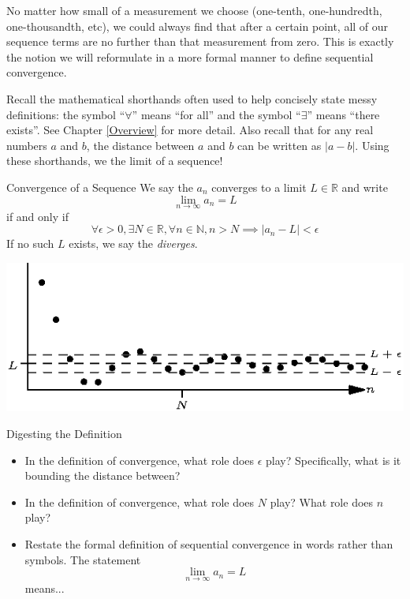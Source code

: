 No matter how small of a measurement we choose (one-tenth, one-hundredth, one-thousandth, etc), we could always find that after a certain point, all of our sequence terms are no further than that measurement from zero.  This is exactly the notion we will reformulate in a more formal manner to define sequential convergence.  

  Recall the mathematical shorthands often used to help concisely state messy definitions: the symbol ``$\forall$'' means ``for all'' and the symbol ``$\exists$'' means ``there exists''.  See Chapter \ref{Overview} for more detail.  Also recall that for any real numbers $a$ and $b$, the distance between $a$ and $b$ can be written as $\left|a-b\right|$.  Using these shorthands, we  the limit of a sequence!

\begin{definition}{Convergence of a Sequence}
We say the  $a_n$ converges to a limit $L\in \mathbb{R}$ and write
$$\lim_{n \rightarrow \infty }a_n=L $$ if and only if$$\forall\epsilon>0, \exists N \in \mathbb{R}, \forall n\in \mathbb{N}, n>N \implies \left| a_n-L\right|<\epsilon$$ If no such $L$ exists, we say the  \emph{diverges}.
\end{definition}

	\begin{center}
	\includegraphics[width=400pt]{ChapterSeqSer/Figures/convergepsilon.eps}
	\end{center}

\begin{exercise}{Digesting the Definition \Coffeecup \Coffeecup}
\begin{itemize}
\item In the definition of convergence, what role does $\epsilon$ play?   Specifically, what is it bounding the distance between?
\item In the definition of convergence, what role does $N$ play?  What role does $n$ play?
\item Restate the formal definition of sequential convergence in words rather than symbols.  The statement 
$$ \lim_{n \rightarrow \infty } a_n = L $$ means...
\end{itemize}
\end{exercise}


